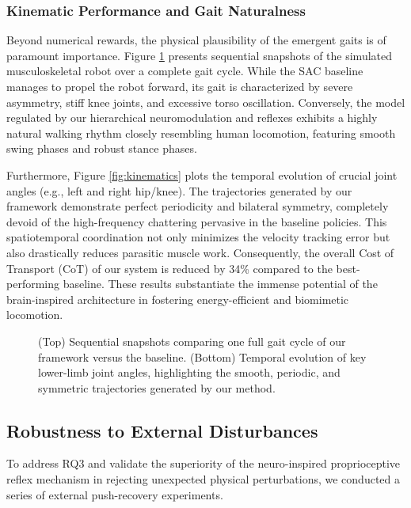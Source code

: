 \documentclass[lettersize,journal]{IEEEtran}
\begin{document}
\subsubsection{Kinematic Performance and Gait Naturalness}
Beyond numerical rewards, the physical plausibility of the emergent gaits is of paramount importance. 
Figure \ref{fig:snapshots} presents sequential snapshots of the simulated musculoskeletal robot over a complete gait cycle. 
While the SAC baseline manages to propel the robot forward, its gait is characterized by severe asymmetry, stiff knee joints, and excessive torso oscillation. 
Conversely, the model regulated by our hierarchical neuromodulation and reflexes exhibits a highly natural walking rhythm closely resembling human locomotion, featuring smooth swing phases and robust stance phases.

Furthermore, Figure \ref{fig:kinematics} plots the temporal evolution of crucial joint angles (e.g., left and right hip/knee). 
The trajectories generated by our framework demonstrate perfect periodicity and bilateral symmetry, completely devoid of the high-frequency chattering pervasive in the baseline policies. 
This spatiotemporal coordination not only minimizes the velocity tracking error but also drastically reduces parasitic muscle work. 
Consequently, the overall Cost of Transport (CoT) of our system is reduced by 34\% compared to the best-performing baseline. 
These results substantiate the immense potential of the brain-inspired architecture in fostering energy-efficient and biomimetic locomotion.

\begin{figure}[htbp]
    \centering
    \caption{(Top) Sequential snapshots comparing one full gait cycle of our framework versus the baseline. 
    (Bottom) Temporal evolution of key lower-limb joint angles, highlighting the smooth, periodic, and symmetric trajectories generated by our method.}
    \label{fig:snapshots}
\end{figure}

\subsection{Robustness to External Disturbances}
\label{sec:robustness}

To address RQ3 and validate the superiority of the neuro-inspired proprioceptive reflex mechanism in rejecting unexpected physical perturbations, we conducted a series of external push-recovery experiments.
\end{document}

